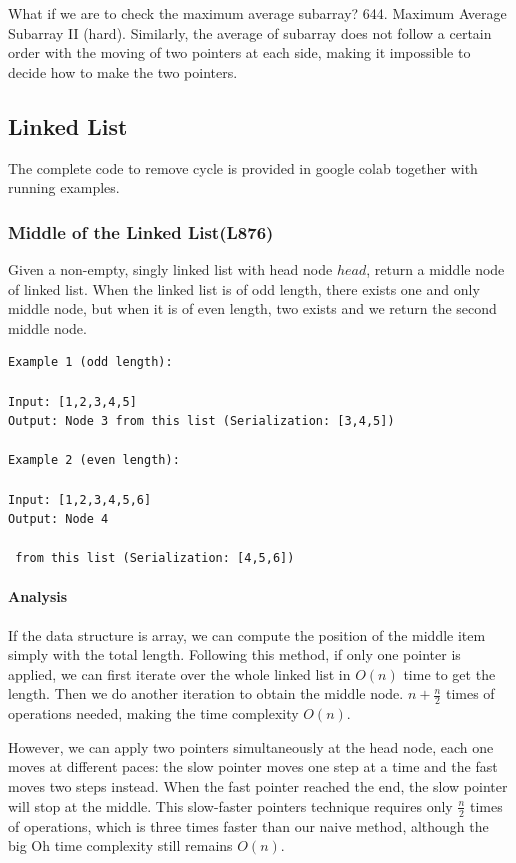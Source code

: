 \documentclass[../main.tex]{subfiles}
\begin{document}
\begin{bclogo}[couleur = blue!30, arrondi=0.1,logo=\bccrayon,ombre=true]{What if we are to check the maximum average subarray? } 
644. Maximum Average Subarray II (hard). Similarly, the average of subarray does not follow a certain order with the moving of two pointers at each side, making it impossible to decide how to make the two pointers.

\end{bclogo}

\subsection{Linked List}
The complete code to remove cycle is provided in google colab together with running examples.
\subsubsection{Middle of the Linked List(L876)} 
Given a non-empty, singly linked list with head node $head$, return a middle node of linked list. When the linked list is of odd length, there exists one and only middle node, but when it is of even length, two exists and we return the second middle node.
\begin{lstlisting}[numbers=none]
Example 1 (odd length):

Input: [1,2,3,4,5]
Output: Node 3 from this list (Serialization: [3,4,5])

Example 2 (even length):

Input: [1,2,3,4,5,6]
Output: Node 4

 from this list (Serialization: [4,5,6])
\end{lstlisting}

\paragraph{Analysis} If the data structure is array, we can compute the position of the middle item simply with the total length. Following this method, if only one pointer is applied, we can first iterate over the whole linked list in $O(n)$ time to get the length. Then we do another iteration to obtain the middle node. $n + \frac{n}{2}$ times of operations  needed, making the time complexity $O(n)$. 

However, we can apply two pointers simultaneously at the head node, each one moves at different paces: the slow pointer moves one step at a time and the fast moves two steps instead. When the fast pointer reached the end, the slow pointer will stop at the middle. This slow-faster pointers technique requires only $\frac{n}{2}$ times of operations, which is three times faster than our naive method, although the big Oh time complexity still remains $O(n)$. 
\end{document}
